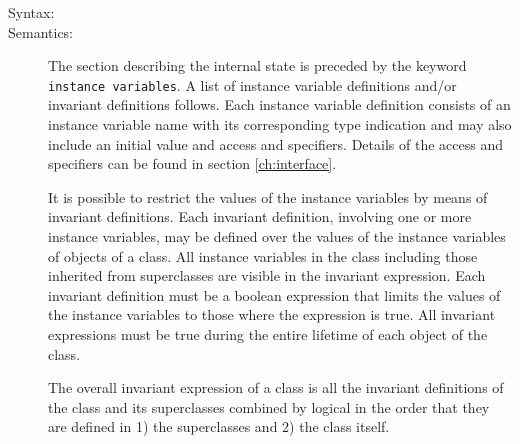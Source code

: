 \documentclass[\pformat,12pt]{article}
\begin{document}
\begin{description}
\item[Syntax:]
  





\item[Semantics:] The section describing the internal state is
preceded by the keyword {\tt instance variables}.  A list of instance
variable definitions and/or invariant definitions follows.  Each
instance variable definition consists of an instance variable name
with its corresponding type indication and may also include an
initial value and access and  specifiers. Details of the
access and  specifiers can be found in section
\ref{ch:interface}. 

It is possible to restrict the values of the instance variables by
means of invariant definitions. Each invariant definition, involving
one or more instance variables, may be defined over the values of the
instance variables of objects of a class. All instance variables in
the class including those inherited from superclasses are visible in
the invariant expression. Each invariant definition must be a 
boolean expression that limits the values of the instance variables to
those where the expression is true. All invariant expressions must be
true during the entire lifetime of each object of the class.

The overall invariant expression of a class is all the invariant
definitions of the class and its superclasses combined by logical
 in the order that they are defined in 1) the superclasses
and 2) the class itself.


\end{description}
\end{document}
